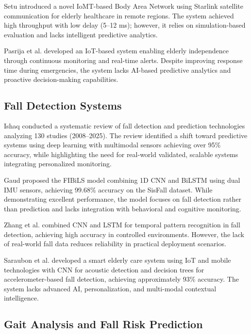 \documentclass[conference]{IEEEtran}
\begin{document}
Setu \cite{setu2025starlink} introduced a novel IoMT-based Body Area Network using Starlink satellite communication for elderly healthcare in remote regions. The system achieved high throughput with low delay (5--12 ms); however, it relies on simulation-based evaluation and lacks intelligent predictive analytics.

Pasrija et al. \cite{pasrija2025} developed an IoT-based system enabling elderly independence through continuous monitoring and real-time alerts. Despite improving response time during emergencies, the system lacks AI-based predictive analytics and proactive decision-making capabilities.

\subsection{Fall Detection Systems}

Ishaq \cite{ishaq2026} conducted a systematic review of fall detection and prediction technologies analyzing 130 studies (2008--2025). The review identified a shift toward predictive systems using deep learning with multimodal sensors achieving over 95\% accuracy, while highlighting the need for real-world validated, scalable systems integrating personalized monitoring.

Gaud \cite{gaud2025} proposed the FIBiLS model combining 1D CNN and BiLSTM using dual IMU sensors, achieving 99.68\% accuracy on the SisFall dataset. While demonstrating excellent performance, the model focuses on fall detection rather than prediction and lacks integration with behavioral and cognitive monitoring.

Zhang et al. \cite{zhang2025} combined CNN and LSTM for temporal pattern recognition in fall detection, achieving high accuracy in controlled environments. However, the lack of real-world fall data reduces reliability in practical deployment scenarios.

Saraubon et al. \cite{saraubon2018} developed a smart elderly care system using IoT and mobile technologies with CNN for acoustic detection and decision trees for accelerometer-based fall detection, achieving approximately 93\% accuracy. The system lacks advanced AI, personalization, and multi-modal contextual intelligence.

\subsection{Gait Analysis and Fall Risk Prediction}
\end{document}
